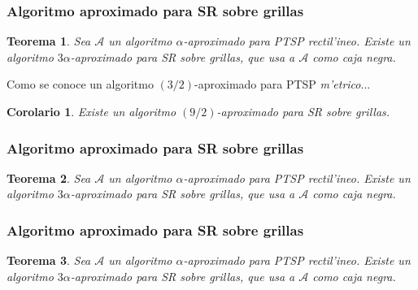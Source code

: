 \documentclass{beamer}
\newcommand{\probl}[1]{\textnormal{\textsf{#1}}}
\newtheorem*{thm}{Teorema}
\newtheorem{cor}{Corolario}
\begin{document}
\begin{frame}
\frametitle{Algoritmo aproximado para \probl{SR} sobre grillas}

\pause

\begin{thm}
Sea $\mathcal{A}$ un algoritmo $\alpha$-aproximado para \probl{PTSP} rectil'ineo. Existe un algoritmo $3\alpha$-aproximado para \probl{SR} sobre grillas, que usa a $\mathcal{A}$ como caja negra.
\end{thm}

\pause

\vspace{3mm}

Como se conoce un algoritmo $(3/2)$-aproximado para \probl{PTSP} \textit{m'etrico}...

\pause

\begin{cor}
Existe un algoritmo $(9/2)$-aproximado para \probl{SR} sobre grillas.
\end{cor}

\end{frame}

\begin{frame}
\frametitle{Algoritmo aproximado para \probl{SR} sobre grillas}

\begin{thm}
Sea $\mathcal{A}$ un algoritmo $\alpha$-aproximado para \probl{PTSP} rectil'ineo. Existe un algoritmo $3\alpha$-aproximado para \probl{SR} sobre grillas, que usa a $\mathcal{A}$ como caja negra.
\end{thm}

\vspace{3mm}

\begin{figure}
	\begin{center}
		
	\end{center}	
\end{figure}

\end{frame}

\begin{frame}
\frametitle{Algoritmo aproximado para \probl{SR} sobre grillas}

\begin{thm}
Sea $\mathcal{A}$ un algoritmo $\alpha$-aproximado para \probl{PTSP} rectil'ineo. Existe un algoritmo $3\alpha$-aproximado para \probl{SR} sobre grillas, que usa a $\mathcal{A}$ como caja negra.
\end{thm}

\vspace{3mm}

\begin{figure}
	\begin{center}
		
	\end{center}	
\end{figure}

\end{frame}
\end{document}
